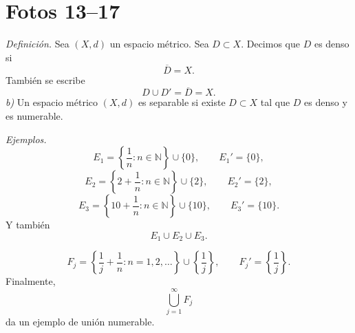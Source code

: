 \documentclass[12pt]{article}
\begin{document}
\section*{Fotos 13--17}

\textit{Definición.} Sea $(X,d)$ un espacio métrico. Sea $D\subset X$. Decimos que $D$ es denso si
\[
\overline D=X.
\]
También se escribe
\[
D\cup D'= \overline D = X.
\]
\textit{b)} Un espacio métrico $(X,d)$ es separable si existe $D\subset X$ tal que $D$ es denso y es numerable.

\textit{Ejemplos.}
\[
E_1=\left\{\frac1n:n\in\mathbb N\right\}\cup\{0\},\qquad E_1'=\{0\},
\]
\[
E_2=\left\{2+\frac1n:n\in\mathbb N\right\}\cup\{2\},\qquad E_2'=\{2\},
\]
\[
E_3=\left\{10+\frac1n:n\in\mathbb N\right\}\cup\{10\},\qquad E_3'=\{10\}.
\]
Y también
\[
E_1\cup E_2\cup E_3.
\]

\[
F_j=\left\{\frac1j+\frac1n:n=1,2,\dots\right\}\cup\left\{\frac1j\right\},
\qquad
F_j'=\left\{\frac1j\right\}.
\]
Finalmente,
\[
\bigcup_{j=1}^\infty F_j
\]
da un ejemplo de unión numerable.
\end{document}
